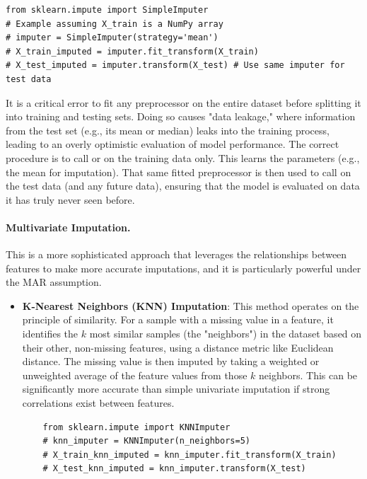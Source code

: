 \begin{itemize}
\begin{verbatim}
from sklearn.impute import SimpleImputer
# Example assuming X_train is a NumPy array
# imputer = SimpleImputer(strategy='mean')
# X_train_imputed = imputer.fit_transform(X_train)
# X_test_imputed = imputer.transform(X_test) # Use same imputer for test data
\end{verbatim}
\begin{remark}
It is a critical error to fit any preprocessor on the entire dataset before splitting it into training and testing sets. Doing so causes "data leakage," where information from the test set (e.g., its mean or median) leaks into the training process, leading to an overly optimistic evaluation of model performance. The correct procedure is to call  or  on the training data only. This learns the parameters (e.g., the mean for imputation). That same fitted preprocessor is then used to call  on the test data (and any future data), ensuring that the model is evaluated on data it has truly never seen before.
\end{remark}

\paragraph{Multivariate Imputation.} This is a more sophisticated approach that leverages the relationships between features to make more accurate imputations, and it is particularly powerful under the MAR assumption.
\begin{itemize}
    \item \textbf{K-Nearest Neighbors (KNN) Imputation}: This method operates on the principle of similarity. For a sample with a missing value in a feature, it identifies the $k$ most similar samples (the "neighbors") in the dataset based on their other, non-missing features, using a distance metric like Euclidean distance. The missing value is then imputed by taking a weighted or unweighted average of the feature values from those $k$ neighbors. This can be significantly more accurate than simple univariate imputation if strong correlations exist between features.
    \begin{verbatim}
    from sklearn.impute import KNNImputer
    # knn_imputer = KNNImputer(n_neighbors=5)
    # X_train_knn_imputed = knn_imputer.fit_transform(X_train)
    # X_test_knn_imputed = knn_imputer.transform(X_test)
    \end{verbatim}
    

\end{itemize}
\end{itemize}
